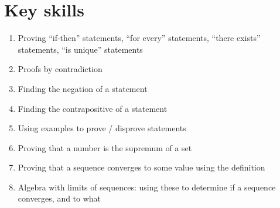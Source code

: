 \documentclass[12pt]{amsart}
\newcommand{\e}{\varepsilon}
\renewcommand{\d}{\delta}
\begin{document}
\section*{Key skills}

\begin{enumerate}
	\item Proving ``if-then'' statements, ``for every'' statements, ``there exists'' statements, ``is unique'' statements
	\item Proofs by contradiction
	\item Finding the negation of a statement
	\item Finding the contrapositive of a statement
	\item Using examples to prove / disprove statements
		
	\item Proving that a number is the supremum of a set

	\item Proving that a sequence converges to some value using the definition

		\item Algebra with limits of sequences: using these to determine if a sequence converges, and to what
	\begin{comment}
	\item Using squeeze theorem to show sequences converge


	\item Relationship between boundedness, convergence, and monotonicity
					\item Proofs by induction
	

	\item Relationship between convergence/boundedness of sequences and convergence of subsequences


	\item Using the $\e-\d$ definition to compute limits
					
	\item Using algebra/squeeze theorem to compute limits
	
	\item Using the $\e-\d$ definition to show continuity

	\item Using algebra/compositions to show continuity
	\item Applying the $\e-\d$ definitions of limits and continuity
					\item Applying the Intermediate Value Theorem
		\item Applying Boundedness and Extreme Value Theorems
		


\end{comment}
\end{enumerate}
\end{document}
